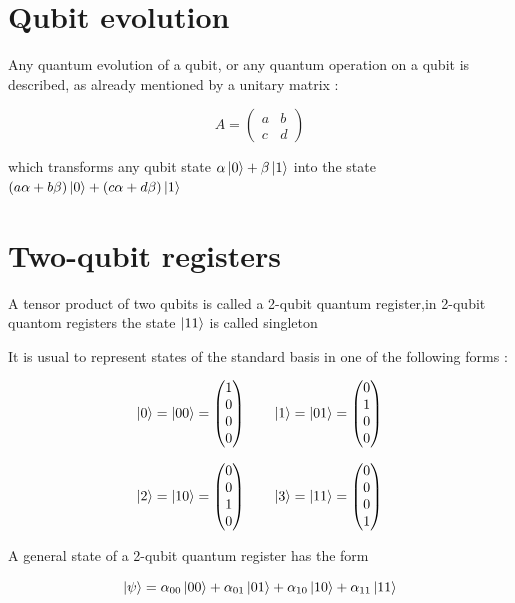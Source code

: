 \documentclass[12pt]{book}
\begin{document}
\section{Qubit evolution}

Any quantum evolution of a qubit, or any quantum operation on a qubit is described, as
already mentioned by a unitary matrix :

$$
A = 
\begin{pmatrix}
a & b\\
c & d 
\end{pmatrix}	
$$


which transforms any qubit state
$\alpha\ket{0} + \beta\ket{1}$
into the state
$(a\alpha+b\beta)\ket{0} + (c\alpha+d\beta)\ket{1}$


\section{Two-qubit registers}

A tensor product of two qubits is called a 2-qubit quantum register,in 2-qubit quantom registers the state $\ket{11}$
 is called singleton

It is usual to represent states of the standard basis in one of the following forms :

$$
\ket{0} = 
\ket{00} =
\begin{pmatrix}
1\\
0\\
0\\
0
\end{pmatrix}
\qquad
\ket{1} = 
\ket{01} =
\begin{pmatrix}
0\\
1\\
0\\
0
\end{pmatrix}
$$

$$
\ket{2} = 
\ket{10} =
\begin{pmatrix}
0\\
0\\
1\\
0
\end{pmatrix}
\qquad
\ket{3} = 
\ket{11} =
\begin{pmatrix}
0\\
0\\
0\\
1
\end{pmatrix}
$$


A general state of a 2-qubit quantum register has the form

$$
\ket{\psi} = \alpha_{00}\ket{00} + \alpha_{01}\ket{01} + \alpha_{10}\ket{10} + \alpha_{11}\ket{11} 
$$
\end{document}
